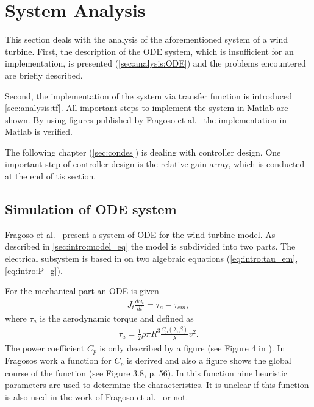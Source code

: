 
\section{System Analysis} \label{sec:analysis}

This section deals with the analysis of the aforementioned system of a wind turbine.
First, the description of the ODE system, which is insufficient for an implementation, is presented (\autoref{sec:analysis:ODE}) and the problems encountered are briefly described.

Second, the implementation of the system via transfer function is introduced \autoref{sec:analysis:tf}.
All important steps to implement the system in Matlab are shown.
By using figures published by Fragoso et al.– \cite{Fragoso_et_al_2017} the implementation in Matlab is verified.

The following chapter (\autoref{sec:condes}) is dealing with controller design. One important step of controller design is the relative gain array, which is conducted at the end of tis section.

\subsection{Simulation of ODE system} \label{sec:analysis:ODE}

Fragoso et al.~ \cite{Fragoso_et_al_2017} present a system of ODE for the wind turbine model.
As described in \autoref{sec:intro:model_eq} the model is subdivided into two parts.
The electrical subsystem is based in on two algebraic equations (\autoref{eq:intro:tau_em}, \autoref{eq:intro:P_g}).

For the mechanical part an ODE is given
\begin{align}
    J_t \frac{d \omega_t}{dt} = \tau_a - \tau_{em}, \label{eq:analysis:ODE_mechanical}
\end{align}
where $\tau_a$ is the aerodynamic torque and defined as
\begin{align}
    \tau_a = \frac{1}{2} \rho \pi R^3 \frac{C_p\left( \lambda, \beta\right)}{\lambda} v^2.
\end{align}
The power coefficient $C_p$ is only described by a figure (see Figure 4 in \cite{Fragoso_et_al_2017}).
In Fragosos work \cite[p. 54 ff.]{Fragoso_PhD_2016} a function for $C_p$ is derived and also a figure shows the global course of the function (see Figure 3.8, p. 56).
In this function nine heuristic parameters are used to determine the characteristics.
It is unclear if this function is also used in the work of Fragoso et al.~ or not.

